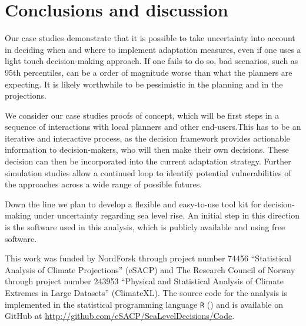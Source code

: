 \documentclass[draft,linenumbers]{agujournal}
\begin{document}
\section{Conclusions and discussion}
\label{disc}
Our case studies demonstrate that it is possible to take uncertainty into account in deciding when and where to implement adaptation measures, even if one uses a light touch decision-making approach. If one fails to do so, bad scenarios, such as 95th percentiles, can be a order of magnitude worse than what the planners are expecting. It is likely worthwhile to be pessimistic in the planning and in the projections. 

We consider our case studies proofs of concept, which will be first steps in a sequence of interactions with local planners and other end-users.This has to be an iterative and interactive process, as the decision framework provides actionable information to decision-makers, who will then make their own decisions. These decision can then be incorporated into the current adaptation strategy. Further simulation studies allow a continued loop to identify potential vulnerabilities of the approaches across a wide range of possible futures.

Down the line we plan to develop a flexible and easy-to-use tool kit for decision-making under uncertainty regarding sea level rise. An initial step in this direction is the software used in this analysis, which is publicly available and using free software. 




\begin{acknowledgments}
This work was funded by NordForsk through project number 74456 ``Statistical Analysis of Climate Projections'' (eSACP) and The Research Council of Norway through project number 243953 ``Physical and Statistical Analysis of Climate Extremes in Large Datasets'' (ClimateXL). The source code for the analysis is implemented in the statistical programming language {\tt R} (\citet{R}) and is available on GitHub at \url{http://github.com/eSACP/SeaLevelDecisions/Code}.
\end{acknowledgments}








\end{document}
